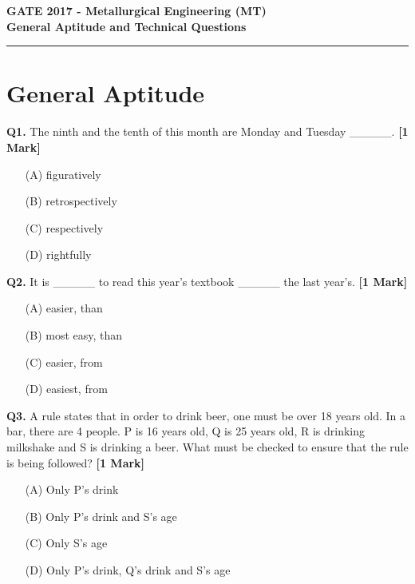 \documentclass[11pt]{article}
\newcommand{\questiona}[2]{
    \noindent\textbf{Q#2.} #1 \hfill \textbf{[1 Mark]}
}
\begin{document}
\begin{center}
    \Large\textbf{GATE 2017 - Metallurgical Engineering (MT)} \\
    \large\textbf{General Aptitude and Technical Questions} \\
    \rule{\textwidth}{0.5pt} %
\end{center}

\vspace{0.5cm}

\section*{General Aptitude}

\questiona{The ninth and the tenth of this month are Monday and Tuesday \_\_\_\_\_.}{1}
\begin{enumerate}
    \item[(A)] figuratively  
    \item[(B)] retrospectively  
    \item[(C)] respectively  
    \item[(D)] rightfully  
\end{enumerate}
\vspace{0.5cm}

\questiona{It is \_\_\_\_\_ to read this year's textbook \_\_\_\_\_ the last year's.}{2}
\begin{enumerate}
    \item[(A)] easier, than  
    \item[(B)] most easy, than  
    \item[(C)] easier, from  
    \item[(D)] easiest, from  
\end{enumerate}
\vspace{0.5cm}

\questiona{A rule states that in order to drink beer, one must be over 18 years old. In a bar, there are 4 people. P is 16 years old, Q is 25 years old, R is drinking milkshake and S is drinking a beer. What must be checked to ensure that the rule is being followed?}{3}
\begin{enumerate}
    \item[(A)] Only P's drink  
    \item[(B)] Only P's drink and S's age  
    \item[(C)] Only S's age  
    \item[(D)] Only P's drink, Q's drink and S's age  
\end{enumerate}
\vspace{0.5cm}
\end{document}
